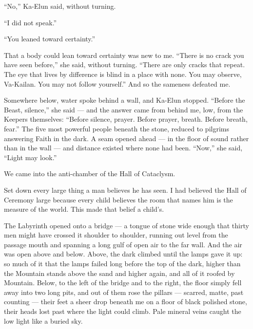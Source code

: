 ``No,'' Ka-Elun said, without turning.\par
 
``I did not speak.''\par
 
``You leaned toward certainty.''\par
 
That a body could lean toward certainty was new to me. ``There is no crack you have seen before,'' she said, without turning. ``There are only cracks that repeat. The eye that lives by difference is blind in a place with none. You may observe, Va-Kailan. You may not follow yourself.'' And so the sameness defeated me.\par
 
Somewhere below, water spoke behind a wall, and Ka-Elun stopped. ``Before the Beast, silence,'' she said --- and the answer came from behind me, low, from the Keepers themselves: ``Before silence, prayer. Before prayer, breath. Before breath, fear.'' The five most powerful people beneath the stone, reduced to pilgrims answering Faith in the dark. A seam opened ahead --- in the floor of sound rather than in the wall --- and distance existed where none had been. ``Now,'' she said, ``Light may look.''\par
 
We came into the anti-chamber of the Hall of Cataclysm.\par
 
Set down every large thing a man believes he has seen. I had believed the Hall of Ceremony large because every child believes the room that names him is the measure of the world. This made that belief a child's.\par

The Labyrinth opened onto a bridge --- a tongue of stone wide enough that thirty men might have crossed it shoulder to shoulder, running out level from the passage mouth and spanning a long gulf of open air to the far wall. And the air was open above and below. Above, the dark climbed until the lamps gave it up: so much of it that the lamps failed long before the top of the dark, higher than the Mountain stands above the sand and higher again, and all of it roofed by Mountain. Below, to the left of the bridge and to the right, the floor simply fell away into two long pits, and out of them rose the pillars --- scarred, matte, past counting --- their feet a sheer drop beneath me on a floor of black polished stone, their heads lost past where the light could climb. Pale mineral veins caught the low light like a buried sky.\par

